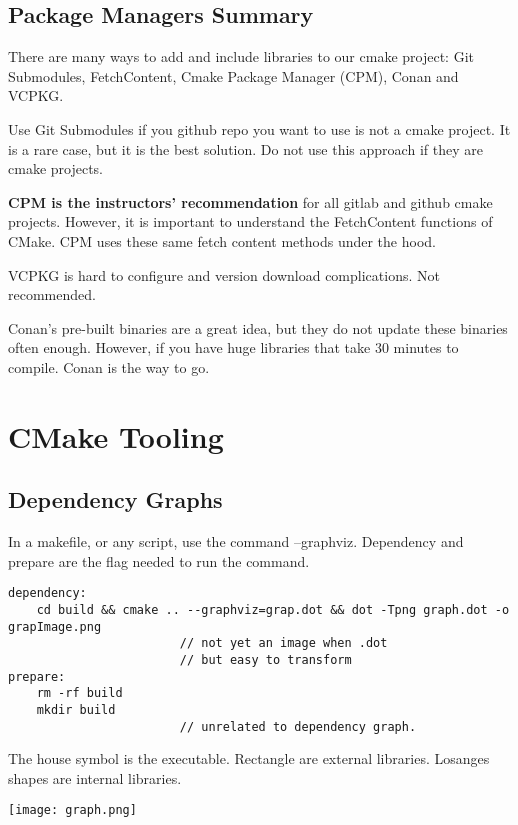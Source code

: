 \documentclass[openany]{report}
\begin{document}
\section{Package Managers Summary}

There are many ways to add and include libraries to our cmake project: Git Submodules, FetchContent,
Cmake Package Manager (CPM), Conan and VCPKG.

Use Git Submodules if you github repo you want to use is not a cmake project. It is a rare case, but it is
the best solution. Do not use this approach if they are cmake projects.


\textbf{CPM is the instructors' recommendation} for all gitlab and github cmake projects. However, it is important to understand the FetchContent functions of 
CMake. CPM uses these same fetch content methods under the hood.


VCPKG is hard to configure and version download complications. Not recommended.

Conan's pre-built binaries are a great idea, but they do not update these binaries often enough. 
However, if you have huge libraries that take 30 minutes to compile. Conan is the way to go.

\chapter{CMake Tooling}

\section{Dependency Graphs}

In a makefile, or any script, use the command --graphviz. Dependency and prepare are the flag needed to run the command.

\begin{verbatim}
dependency:
    cd build && cmake .. --graphviz=grap.dot && dot -Tpng graph.dot -o grapImage.png
                        // not yet an image when .dot
                        // but easy to transform
prepare:
    rm -rf build
    mkdir build
                        // unrelated to dependency graph.
\end{verbatim}

The house symbol is the executable. Rectangle are external libraries. Losanges shapes are internal libraries.

\begin{center}
    \texttt{[image: graph.png]}
\end{center}
\end{document}
